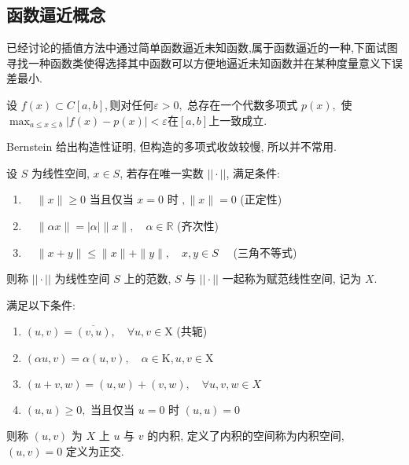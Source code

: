 \documentclass[10pt]{yerbaformat}
\begin{document}
\subsection{函数逼近概念}

\par 已经讨论的插值方法中通过简单函数逼近未知函数,属于函数逼近的一种,下面试图寻找一种函数类使得选择其中函数可以方便地逼近未知函数并在某种度量意义下误差最小.

\begin{theorem}
    设 $f(x) \subset C [a, b],$则对任何$\varepsilon>0,$ 总存在一个代数多项式 $p(x),$ 使$\max _{a \leq x \leq b}|f(x)-p(x)|<\varepsilon$在$[a,b]$上一致成立.
\end{theorem}

\par Bernstein 给出构造性证明, 但构造的多项式收敛较慢, 所以并不常用.

\begin{definition}[赋范线性空间]
    设 $S$ 为线性空间, $x \in S$, 若存在唯一实数 $||\cdot||$, 满足条件:
    \begin{enumerate}
        \item  $\quad\|x\| \geq 0$ 当且仅当 $x=0$ 时 $,\|x\|=0$ (正定性)
        \item  $\quad\|\alpha x\|=|\alpha|\|x\|, \quad \alpha \in \mathbb{R}$ (齐次性)
        \item  $\quad\|x+y\| \leq\|x\|+\|y\|, \quad x, y \in S \quad$ (三角不等式)
    \end{enumerate}
    则称 $||\cdot||$ 为线性空间 $S$ 上的范数, $S$ 与 $||\cdot||$ 一起称为赋范线性空间, 记为 $X$.
\end{definition}


\begin{definition}[内积]
    满足以下条件:
    \begin{enumerate}
        \item $(u, v)=\overline{(v, u)}, \quad \forall u, v \in \mathrm{X}$ (共轭)
        \item $(\alpha u, v)=\alpha(u, v), \quad \alpha \in \mathrm{K}, u, v \in \mathrm{X}$
        \item $(u+v, w)=(u, w)+(v, w), \quad \forall u, v, w \in X$
        \item $(u, u) \geq 0, \text { 当且仅当 } u=0 \text { 时 } (u, u)=0$
    \end{enumerate}
    则称 $(u, v)$ 为 $X$ 上 $u$ 与 $v$ 的内积, 定义了内积的空间称为内积空间, $(u,v)=0$ 定义为正交.
\end{definition}
\end{document}
